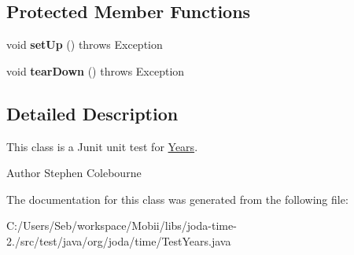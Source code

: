\subsection*{Protected Member Functions}
\begin{DoxyCompactItemize}
\item 
\hypertarget{classorg_1_1joda_1_1time_1_1_test_years_a98fe7438522450d66188692c3017e5e2}{void {\bfseries set\-Up} ()  throws Exception }\label{classorg_1_1joda_1_1time_1_1_test_years_a98fe7438522450d66188692c3017e5e2}

\item 
\hypertarget{classorg_1_1joda_1_1time_1_1_test_years_a83d537566434983d86d19c9975e7f855}{void {\bfseries tear\-Down} ()  throws Exception }\label{classorg_1_1joda_1_1time_1_1_test_years_a83d537566434983d86d19c9975e7f855}

\end{DoxyCompactItemize}


\subsection{Detailed Description}
This class is a Junit unit test for \hyperlink{classorg_1_1joda_1_1time_1_1_years}{Years}.

\begin{DoxyAuthor}{Author}
Stephen Colebourne 
\end{DoxyAuthor}


The documentation for this class was generated from the following file\-:\begin{DoxyCompactItemize}
\item 
C\-:/\-Users/\-Seb/workspace/\-Mobii/libs/joda-\/time-\/2./src/test/java/org/joda/time/Test\-Years.\-java\end{DoxyCompactItemize}
